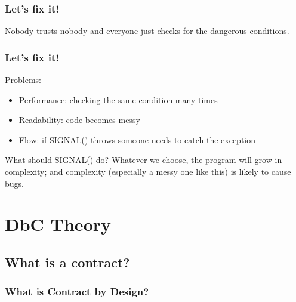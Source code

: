 \documentclass{beamer}
\begin{document}
\begin{frame}
\frametitle{Let's fix it!}

\pause
\begin{block}{}
Nobody trusts nobody and everyone just checks for the dangerous conditions.
\end{block}
\end{frame}

\begin{frame}
\frametitle{Let's fix it!}
Problems:
\begin{itemize}[<+->]
  \item Performance: checking the same condition many times
  \item Readability: code becomes messy
  \item Flow: if SIGNAL() throws someone needs to catch the exception
\end{itemize}
\pause
\begin{block}{What should SIGNAL() do?}
\pause
Whatever we choose, the program will grow in complexity; and complexity (especially a messy one like this) is likely to cause bugs.
\end{block}
\end{frame}



\section{DbC Theory}
\subsection{What is a contract?}
\begin{frame}
\frametitle{What is Contract by Design?}
\end{frame}
\end{document}
